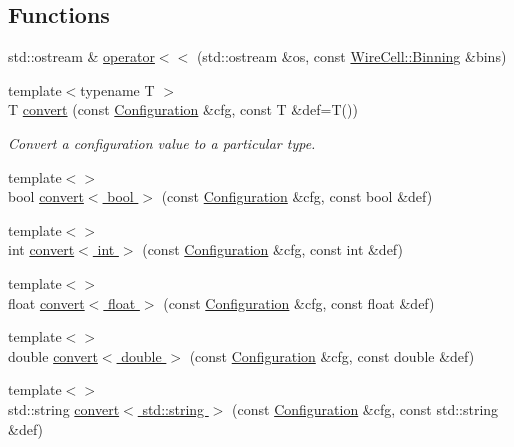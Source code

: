 \subsection*{Functions}
\begin{DoxyCompactItemize}
\item 
std\+::ostream \& \hyperlink{namespace_wire_cell_a7c36c8ada205f970a75ddb4e0841ff43}{operator$<$$<$} (std\+::ostream \&os, const \hyperlink{class_wire_cell_1_1_binning}{Wire\+Cell\+::\+Binning} \&bins)
\item 
{\footnotesize template$<$typename T $>$ }\\T \hyperlink{namespace_wire_cell_a5f6648d6ae801b20a17b8a35fd3306e5}{convert} (const \hyperlink{namespace_wire_cell_a9f705541fc1d46c608b3d32c182333ee}{Configuration} \&cfg, const T \&def=T())
\begin{DoxyCompactList}\small\item\em Convert a configuration value to a particular type. \end{DoxyCompactList}\item 
{\footnotesize template$<$$>$ }\\bool \hyperlink{namespace_wire_cell_ac37e45ffe2bff57d04d3a4b63880f56e}{convert$<$ bool $>$} (const \hyperlink{namespace_wire_cell_a9f705541fc1d46c608b3d32c182333ee}{Configuration} \&cfg, const bool \&def)
\item 
{\footnotesize template$<$$>$ }\\int \hyperlink{namespace_wire_cell_aaf4b353f8d18d8e510569614e22b8bab}{convert$<$ int $>$} (const \hyperlink{namespace_wire_cell_a9f705541fc1d46c608b3d32c182333ee}{Configuration} \&cfg, const int \&def)
\item 
{\footnotesize template$<$$>$ }\\float \hyperlink{namespace_wire_cell_af4f0d30f38b85de317c7766d8edb3e5b}{convert$<$ float $>$} (const \hyperlink{namespace_wire_cell_a9f705541fc1d46c608b3d32c182333ee}{Configuration} \&cfg, const float \&def)
\item 
{\footnotesize template$<$$>$ }\\double \hyperlink{namespace_wire_cell_a09f4e09c04881f2ae1c38305dca95d3e}{convert$<$ double $>$} (const \hyperlink{namespace_wire_cell_a9f705541fc1d46c608b3d32c182333ee}{Configuration} \&cfg, const double \&def)
\item 
{\footnotesize template$<$$>$ }\\std\+::string \hyperlink{namespace_wire_cell_ab3c7d840d10160c3ba263190198fed68}{convert$<$ std\+::string $>$} (const \hyperlink{namespace_wire_cell_a9f705541fc1d46c608b3d32c182333ee}{Configuration} \&cfg, const std\+::string \&def)

\end{DoxyCompactItemize}
